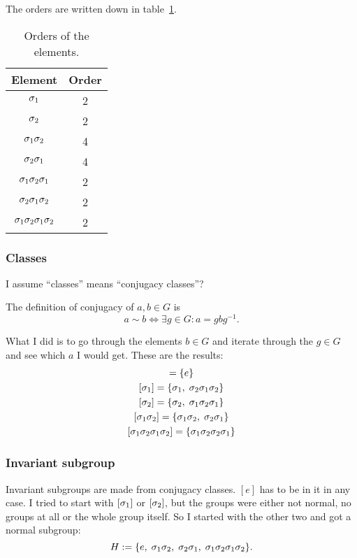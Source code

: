 \documentclass[11pt, english, fleqn, DIV=15, headinclude, BCOR=1cm]{scrartcl}
\newcommand\inv{^{-1}}
\begin{document}
The orders are written down in table~\ref{tab:orders}.

\begin{table}[htbp]
    \centering
    \begin{tabular}{cc}
        Element & Order \\
        \midrule
        $\sigma_1$ & 2 \\
        $\sigma_2$ & 2 \\
        $\sigma_1\sigma_2$ & 4 \\
        $\sigma_2\sigma_1$ & 4 \\
        $\sigma_1\sigma_2\sigma_1$ & 2 \\
        $\sigma_2\sigma_1\sigma_2$ & 2 \\
        $\sigma_1\sigma_2\sigma_1\sigma_2$ & 2
    \end{tabular}
    \caption{%
        Orders of the elements.
    }
    \label{tab:orders}
\end{table}

\subsubsection{Classes}

I assume “classes” means “conjugacy classes”?

The definition of conjugacy of $a, b \in G$ is
\[
    a \sim b
    \iff
    \exists g \in G \colon
    a = g b g\inv.
\]

What I did is to go through the elements $b \in G$ and iterate through the $g
\in G$ and see which $a$ I would get. These are the results:
\begin{gather*}
    [e] = \{ e \} \\
    [\1] = \{ \1 \ssep \2\1\2 \} \\
    [\2] = \{ \2 \ssep \1\2\1 \} \\
    [\1\2] = \{ \1\2 \ssep \2\1 \} \\
    [\1\2\1\2] = \{ \1\2\2\1 \}
\end{gather*}

\subsubsection{Invariant subgroup}

Invariant subgroups are made from conjugacy classes. $[e]$ has to be in it in
any case. I tried to start with $[\sigma_1]$ or $[\sigma_2]$, but the groups were either
not normal, no groups at all or the whole group itself. So I started with the
other two and got a normal subgroup:
\[
    H := \{ e ,\; \sigma_1\sigma_2 ,\; \sigma_2\sigma_1 ,\; \sigma_1\sigma_2\sigma_1\sigma_2 \}.
\]
\end{document}
